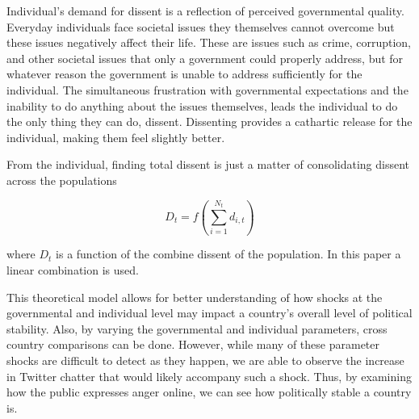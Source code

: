 \documentclass[12pt]{article}
\begin{document}
\begin{spacing}{1.5}
Individual's demand for dissent is a reflection of perceived governmental quality. Everyday individuals face societal issues they themselves cannot overcome but these issues negatively affect their life. These are issues such as crime, corruption, and other societal issues that only a government could properly address, but for whatever reason the government is unable to address sufficiently for the individual. The simultaneous frustration with governmental expectations and the inability to do anything about the issues themselves, leads the individual to do the only thing they can do, dissent. Dissenting provides a cathartic release for the individual, making them feel slightly better. 

From the individual, finding total dissent is just a matter of consolidating dissent across the populations 

\vspace{.5 em}
\begin{equation}
{D_t}= f\left(   \sum_{i=1}^{N_{t}} {d_{i,t}} \right) 	
\end{equation}	

\noindent where $D_t$ is a function of the combine dissent of the population. In this paper a linear combination is used.  




This theoretical model allows for better understanding of how shocks at the governmental and individual level may impact a country’s overall level of political stability. Also, by varying the governmental and individual parameters, cross country comparisons can be done. However, while many of these parameter shocks are difficult to detect as they happen, we are able to observe the increase in Twitter chatter that would likely accompany such a shock. Thus, by examining how the public expresses anger online, we can see how politically stable a country is. 


\end{spacing}
\end{document}
